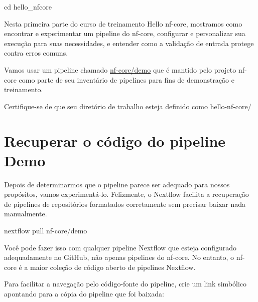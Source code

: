 \documentclass[
  brazilian,
  letterpaper,
  DIV=11,
  numbers=noendperiod]{scrreprt}
\newenvironment{Shaded}{\begin{snugshade}}{\end{snugshade}}
\newcommand{\AttributeTok}[1]{\textcolor[rgb]{0.40,0.45,0.13}{#1}}
\newcommand{\BuiltInTok}[1]{\textcolor[rgb]{0.00,0.23,0.31}{#1}}
\newcommand{\ExtensionTok}[1]{\textcolor[rgb]{0.00,0.23,0.31}{#1}}
\newcommand{\FunctionTok}[1]{\textcolor[rgb]{0.28,0.35,0.67}{#1}}
\newcommand{\NormalTok}[1]{\textcolor[rgb]{0.00,0.23,0.31}{#1}}
\newcommand{\PreprocessorTok}[1]{\textcolor[rgb]{0.68,0.00,0.00}{#1}}
\newcommand{\StringTok}[1]{\textcolor[rgb]{0.13,0.47,0.30}{#1}}
\newcommand{\VariableTok}[1]{\textcolor[rgb]{0.07,0.07,0.07}{#1}}
\begin{document}
\begin{Shaded}
\begin{Highlighting}[]
\BuiltInTok{cd}\NormalTok{ hello\_nfcore}
\end{Highlighting}
\end{Shaded}

Nesta primeira parte do curso de treinamento Hello nf-core, mostramos
como encontrar e experimentar um pipeline do nf-core, configurar e
personalizar sua execução para suas necessidades, e entender como a
validação de entrada protege contra erros comuns.

Vamos usar um pipeline chamado
\href{https://nf-co.re/demo/1.2.0/}{nf-core/demo} que é mantido pelo
projeto nf-core como parte de seu inventário de pipelines para fins de
demonstração e treinamento.

Certifique-se de que seu diretório de trabalho esteja definido como
hello-nf-core/

\section{Recuperar o código do pipeline
Demo}\label{recuperar-o-cuxf3digo-do-pipeline-demo}

Depois de determinarmos que o pipeline parece ser adequado para nossos
propósitos, vamos experimentá-lo. Felizmente, o Nextflow facilita a
recuperação de pipelines de repositórios formatados corretamente sem
precisar baixar nada manualmente.

\begin{Shaded}
\begin{Highlighting}[]
\ExtensionTok{nextflow}\NormalTok{ pull nf{-}core/demo}
\end{Highlighting}
\end{Shaded}

Você pode fazer isso com qualquer pipeline Nextflow que esteja
configurado adequadamente no GitHub, não apenas pipelines do nf-core. No
entanto, o nf-core é a maior coleção de código aberto de pipelines
Nextflow.

Para facilitar a navegação pelo código-fonte do pipeline, crie um link
simbólico apontando para a cópia do pipeline que foi baixada:

\begin{Shaded}
\end{Shaded}
\end{document}
